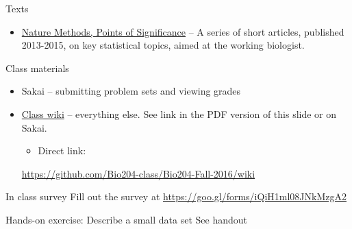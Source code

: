 \documentclass[presentation]{beamer}
\begin{document}
\begin{frame}[label={sec:orgheadline14}]{Texts}
\begin{itemize}
\item \href{http://www.nature.com/collections/qghhqm/pointsofsignificance}{Nature Methods, Points of Significance} -- A series of short articles, published 2013-2015, on key statistical topics, aimed at the working biologist.
\end{itemize}
\end{frame}

\begin{frame}[label={sec:orgheadline15}]{Class materials}
\begin{itemize}
\item Sakai -- submitting problem sets and viewing grades

\item \href{https://github.com/Bio204-class/Bio204-Fall-2016/wiki}{Class wiki} -- everything else. See link in the PDF version of this slide or on Sakai. 
\begin{itemize}
\item Direct link:
\end{itemize}
\url{https://github.com/Bio204-class/Bio204-Fall-2016/wiki}
\end{itemize}
\end{frame}

\begin{frame}[label={sec:orgheadline16}]{In class survey}
Fill out the survey at \url{https://goo.gl/forms/iQiH1ml08JNkMzgA2}
\end{frame}


\begin{frame}[label={sec:orgheadline17}]{Hands-on exercise: Describe a small data set}
See handout
\end{frame}
\end{document}
